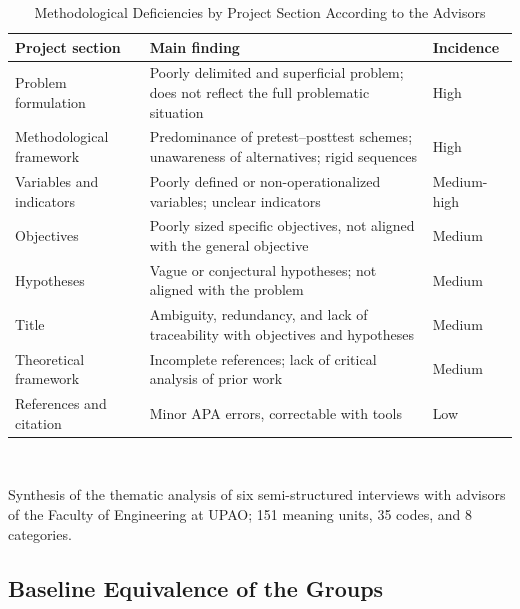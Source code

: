 \documentclass[journal]{IEEEtran}
\begin{document}
\begin{table}[!t]
\caption{Methodological Deficiencies by Project Section According to the Advisors}
\label{tab:interviews}
\centering
\footnotesize
\begin{tabular}{L{1.9cm}L{4.4cm}L{1.2cm}}
\toprule
Project section & Main finding & Incidence \\
\midrule
Problem formulation & Poorly delimited and superficial problem; does not reflect the full problematic situation & High \\
Methodological framework & Predominance of pretest--posttest schemes; unawareness of alternatives; rigid sequences & High \\
Variables and indicators & Poorly defined or non-operationalized variables; unclear indicators & Medium-high \\
Objectives & Poorly sized specific objectives, not aligned with the general objective & Medium \\
Hypotheses & Vague or conjectural hypotheses; not aligned with the problem & Medium \\
Title & Ambiguity, redundancy, and lack of traceability with objectives and hypotheses & Medium \\
Theoretical framework & Incomplete references; lack of critical analysis of prior work & Medium \\
References and citation & Minor APA errors, correctable with tools & Low \\
\bottomrule
\end{tabular}
\\[2pt]
\raggedright\scriptsize Synthesis of the thematic analysis of six semi-structured interviews with advisors of the Faculty of Engineering at UPAO; 151 meaning units, 35 codes, and 8 categories.
\end{table}

\subsection{Baseline Equivalence of the Groups}
\end{document}
